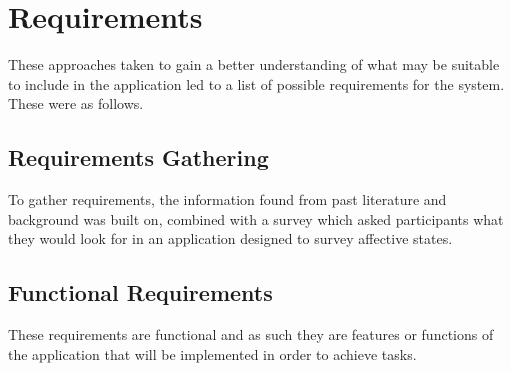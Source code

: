 \documentclass{l4proj}
\begin{document}
\section{Requirements}
These approaches taken to gain a better understanding of what may be suitable to include in the application led to a list of possible requirements for the system. These were as follows.

\subsection{Requirements Gathering}
To gather requirements, the information found from past literature and background was built on, combined with a survey which asked participants what they would look for in an application designed to survey affective states.

\subsection{Functional Requirements}
These requirements are functional and as such they are features or functions of the application that will be implemented in order to achieve tasks.
\end{document}
